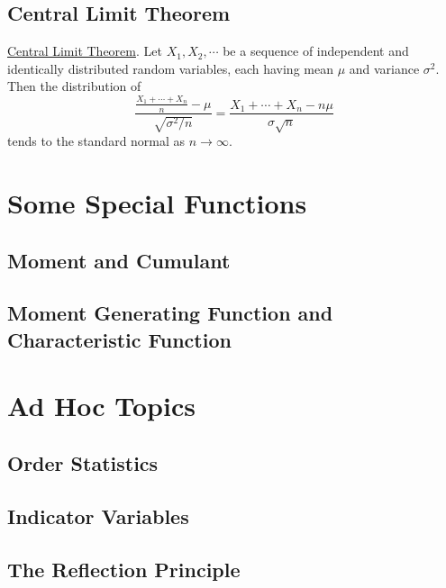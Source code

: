 \subsection{Central Limit Theorem}
\begin{theorem}
	{\underline{Central Limit Theorem}}. Let $X_1, X_2, \cdots$ be a sequence of independent and identically distributed random variables, each having mean $\mu$ and variance $\sigma^2$. Then the distribution of $$\frac{\frac{X_1+\cdots+X_n}{n}-\mu}{\sqrt{\sigma^2/n}} = \frac{X_1+\cdots+X_n - n\mu}{\sigma \sqrt{n}}$$ tends to the standard normal as $n \to \infty$.
\end{theorem}


\section{Some Special Functions}
\subsection{Moment and Cumulant}
\subsection{Moment Generating Function and Characteristic Function}

\section{Ad Hoc Topics}
\subsection{Order Statistics}
\subsection{Indicator Variables}
\subsection{The Reflection Principle}